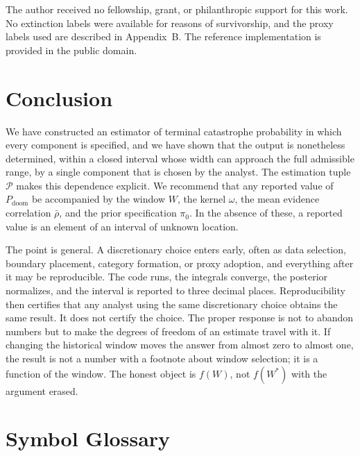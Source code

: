 \documentclass[11pt]{article}
\theoremstyle{remark}
\newcommand{\PD}{P_{\mathrm{doom}}}
\newcommand{\rhobar}{\bar{\rho}}
\begin{document}
The author received no fellowship, grant, or philanthropic support for this work. No extinction labels were available for reasons of survivorship, and the proxy labels used are described in Appendix~B. The reference implementation is provided in the public domain.

\section{Conclusion}

We have constructed an estimator of terminal catastrophe probability in which every component is specified, and we have shown that the output is nonetheless determined, within a closed interval whose width can approach the full admissible range, by a single component that is chosen by the analyst. The estimation tuple $\mathcal{P}$ makes this dependence explicit. We recommend that any reported value of $\PD$ be accompanied by the window $W$, the kernel $\omega$, the mean evidence correlation $\rhobar$, and the prior specification $\pi_0$. In the absence of these, a reported value is an element of an interval of unknown location.

The point is general. A discretionary choice enters early, often as data selection, boundary placement, category formation, or proxy adoption, and everything after it may be reproducible. The code runs, the integrals converge, the posterior normalizes, and the interval is reported to three decimal places. Reproducibility then certifies that any analyst using the same discretionary choice obtains the same result. It does not certify the choice. The proper response is not to abandon numbers but to make the degrees of freedom of an estimate travel with it. If changing the historical window moves the answer from almost zero to almost one, the result is not a number with a footnote about window selection; it is a function of the window. The honest object is $f(W)$, not $f(W^{\ast})$ with the argument erased.

\appendix
\section{Symbol Glossary}
\end{document}
